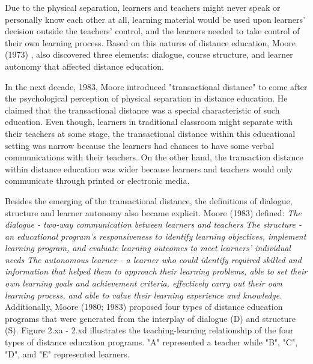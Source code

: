 Due to the physical separation, learners and teachers might never speak or personally know each other at all, learning material would be used upon learners' decision outside the teachers' control, and the learners needed to take control of their own learning process. Based on this natures of distance education, Moore (1973) \cite{moore1973toward}, also discovered three elements: dialogue, course structure, and learner autonomy that affected distance education.

In the next decade, 1983, Moore \cite{moore1983individual} introduced "transactional distance" to come after the psychological perception of physical separation in distance education. He claimed that the transactional distance was a special characteristic of such education. Even though, learners in traditional classroom might separate with their teachers at some stage, the transactional distance within this educational setting was narrow because the learners had chances to have some verbal communications with their teachers. On the other hand, the transaction distance within distance education was wider because learners and teachers would only communicate through printed or electronic media. 

Besides the emerging of the transactional distance, the definitions of dialogue, structure and learner autonomy also became explicit. Moore (1983) \cite{moore1983individual} defined: 
\newline 
\newline \textit{The dialogue - two-way communication between learners and teachers}
\newline 
\newline \textit{The structure - an educational program's responsiveness to identify learning objectives, implement learning program, and evaluate learning outcomes to meet learners' individual needs}
\newline 
\newline \textit{The autonomous learner - a learner who could identify required skilled and information that helped them to approach their learning problems, able to set their own learning goals and achievement criteria, effectively carry out their own learning process, and able to value their learning experience and knowledge.} 
\newline 
\newline Additionally, Moore (1980; 1983) \cite{moore1980independent, moore1983individual} proposed four types of distance education programs that were generated from the interplay of dialogue (D) and structure (S). Figure 2.xa - 2.xd illustrates the teaching-learning relationship of the four types of distance education programs. "A" represented a teacher while "B", "C", "D", and "E" represented learners. 

